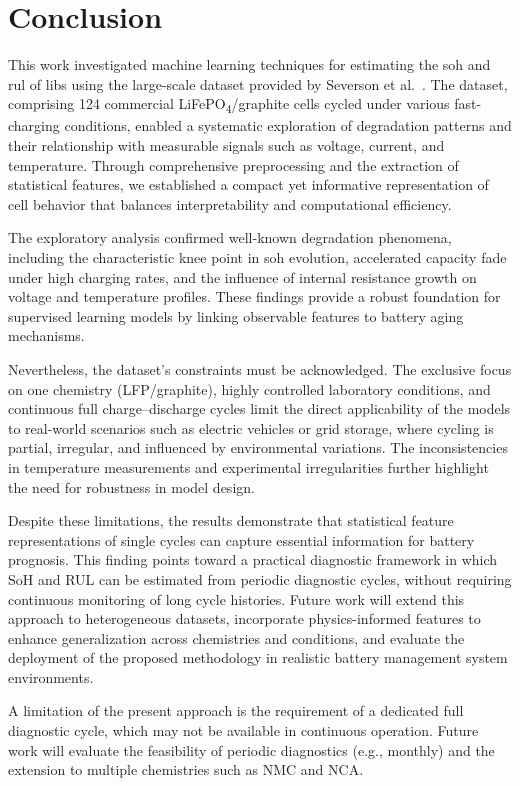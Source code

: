 \section{Conclusion} \label{sec:conclusions}

This work investigated machine learning techniques for estimating the \acf{soh} and \acf{rul} of \acf{libs} using the large-scale dataset provided by Severson et al.~\cite{sev2019}. The dataset, comprising 124 commercial LiFePO\textsubscript{4}/graphite cells cycled under various fast-charging conditions, enabled a systematic exploration of degradation patterns and their relationship with measurable signals such as voltage, current, and temperature. Through comprehensive preprocessing and the extraction of statistical features, we established a compact yet informative representation of cell behavior that balances interpretability and computational efficiency.  

The exploratory analysis confirmed well-known degradation phenomena, including the characteristic knee point in \ac{soh} evolution, accelerated capacity fade under high charging rates, and the influence of internal resistance growth on voltage and temperature profiles. These findings provide a robust foundation for supervised learning models by linking observable features to battery aging mechanisms.  

Nevertheless, the dataset’s constraints must be acknowledged. The exclusive focus on one chemistry (LFP/graphite), highly controlled laboratory conditions, and continuous full charge--discharge cycles limit the direct applicability of the models to real-world scenarios such as electric vehicles or grid storage, where cycling is partial, irregular, and influenced by environmental variations. The inconsistencies in temperature measurements and experimental irregularities further highlight the need for robustness in model design.

Despite these limitations, the results demonstrate that statistical feature representations of single cycles can capture essential information for battery prognosis. This finding points toward a practical diagnostic framework in which SoH and RUL can be estimated from periodic diagnostic cycles, without requiring continuous monitoring of long cycle histories. Future work will extend this approach to heterogeneous datasets, incorporate physics-informed features to enhance generalization across chemistries and conditions, and evaluate the deployment of the proposed methodology in realistic battery management system environments.  

A limitation of the present approach is the requirement of a dedicated full diagnostic cycle, which may not be available in continuous operation. Future work will evaluate the feasibility of periodic diagnostics (e.g., monthly) and the extension to multiple chemistries such as NMC and NCA.
